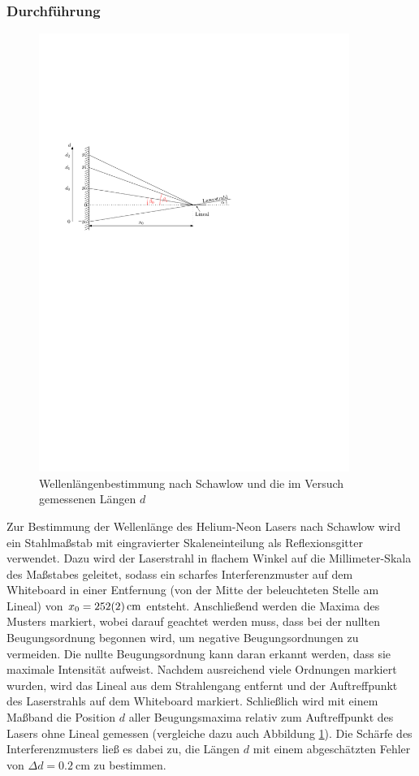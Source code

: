 \documentclass[11pt, a4paper]{article}
\numberwithin{equation}{section}
\begin{document}
\subsubsection{Durchführung}
\begin{figure}[h]
	\centering
	\includegraphics[width=0.9\textwidth]{./figures/wellenlaenge_lineal.pdf}
	\caption{Wellenlängenbestimmung nach Schawlow \cite{schawlow} und die im Versuch gemessenen Längen $d$}
	\label{fig:schawlow}
\end{figure}
Zur Bestimmung der Wellenlänge des Helium-Neon Lasers nach Schawlow \cite{schawlow} wird ein Stahlmaßstab mit eingravierter Skaleneinteilung als Reflexionsgitter verwendet.
Dazu wird der Laserstrahl in flachem Winkel auf die Millimeter-Skala des Maßstabes geleitet, sodass ein scharfes Interferenzmuster auf dem Whiteboard in einer Entfernung (von der Mitte der beleuchteten Stelle am Lineal) von $x_0 = \SI{252 +- 2}{\centi\metre}$ entsteht.
Anschließend werden die Maxima des Musters markiert, wobei darauf geachtet werden muss, dass bei der nullten Beugungsordnung begonnen wird, um negative Beugungsordnungen zu vermeiden.
Die nullte Beugungsordnung kann daran erkannt werden, dass sie maximale Intensität aufweist.
Nachdem ausreichend viele Ordnungen markiert wurden, wird das Lineal aus dem Strahlengang entfernt und der Auftreffpunkt des Laserstrahls auf dem Whiteboard markiert.
Schließlich wird mit einem Maßband die Position $d$ aller Beugungsmaxima relativ zum Auftreffpunkt des Lasers ohne Lineal gemessen (vergleiche dazu auch Abbildung \ref{fig:schawlow}).
Die Schärfe des Interferenzmusters ließ es dabei zu, die Längen $d$ mit einem abgeschätzten Fehler von $\Delta d = \SI{0.2}{\centi\metre}$ zu bestimmen.
\end{document}
